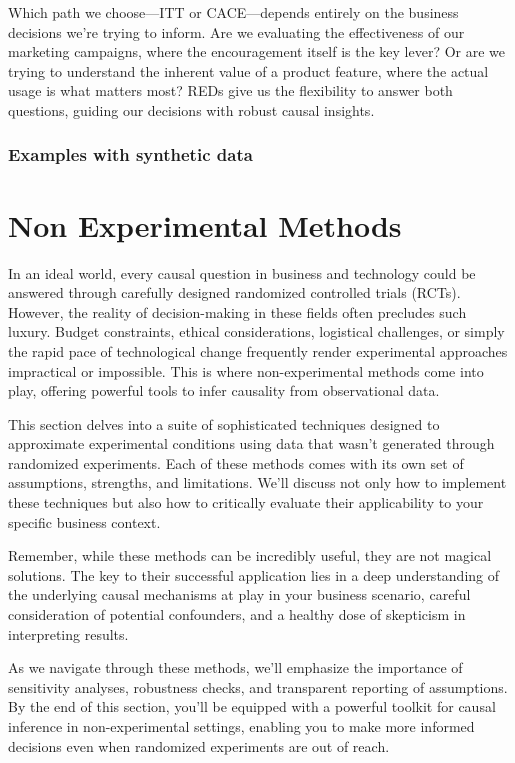 \documentclass[
  letterpaper,
  DIV=11,
  numbers=noendperiod]{scrreprt}
\begin{document}
Which path we choose---ITT or CACE---depends entirely on the business
decisions we're trying to inform. Are we evaluating the effectiveness of
our marketing campaigns, where the encouragement itself is the key
lever? Or are we trying to understand the inherent value of a product
feature, where the actual usage is what matters most? REDs give us the
flexibility to answer both questions, guiding our decisions with robust
causal insights.

\section{Examples with synthetic
data}\label{examples-with-synthetic-data}

\part{Non Experimental Methods}

In an ideal world, every causal question in business and technology
could be answered through carefully designed randomized controlled
trials (RCTs). However, the reality of decision-making in these fields
often precludes such luxury. Budget constraints, ethical considerations,
logistical challenges, or simply the rapid pace of technological change
frequently render experimental approaches impractical or impossible.
This is where non-experimental methods come into play, offering powerful
tools to infer causality from observational data.

This section delves into a suite of sophisticated techniques designed to
approximate experimental conditions using data that wasn't generated
through randomized experiments. Each of these methods comes with its own
set of assumptions, strengths, and limitations. We'll discuss not only
how to implement these techniques but also how to critically evaluate
their applicability to your specific business context.

Remember, while these methods can be incredibly useful, they are not
magical solutions. The key to their successful application lies in a
deep understanding of the underlying causal mechanisms at play in your
business scenario, careful consideration of potential confounders, and a
healthy dose of skepticism in interpreting results.

As we navigate through these methods, we'll emphasize the importance of
sensitivity analyses, robustness checks, and transparent reporting of
assumptions. By the end of this section, you'll be equipped with a
powerful toolkit for causal inference in non-experimental settings,
enabling you to make more informed decisions even when randomized
experiments are out of reach.
\end{document}
